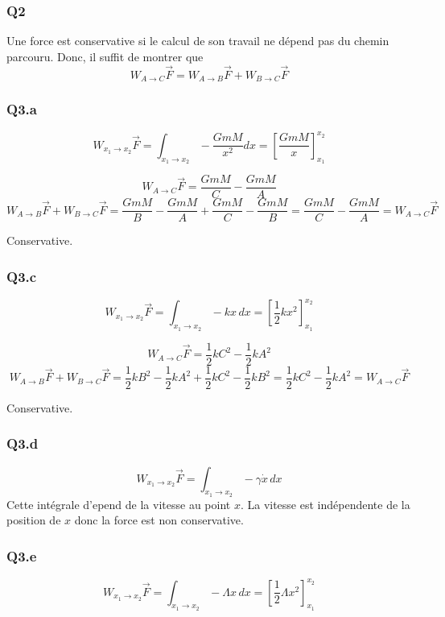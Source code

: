 \documentclass[]{book}
\theoremstyle{definition}
\begin{document}
\subsubsection{Q2}
Une force est conservative si le calcul de son travail ne d\'epend pas du chemin parcouru. Donc, il suffit de montrer que
$$W_{A \to C}\overrightarrow{F} = W_{A \to B}\overrightarrow{F} + W_{B \to C}\overrightarrow{F}$$

\subsubsection{Q3.a}
$$W_{x_1 \to x_2}\overrightarrow{F} = \int_{x_1 \to x_2} -\frac{GmM}{x^2} dx = [\frac{GmM}{x}]_{x_1}^{x_2}$$

$$W_{A \to C}\overrightarrow{F} = \frac{GmM}{C} - \frac{GmM}{A}$$
$$W_{A \to B}\overrightarrow{F} + W_{B \to C}\overrightarrow{F} = \frac{GmM}{B} - \frac{GmM}{A} + \frac{GmM}{C} - \frac{GmM}{B} = \frac{GmM}{C} - \frac{GmM}{A} = W_{A \to C}\overrightarrow{F}$$

Conservative.

\subsubsection{Q3.c}
$$W_{x_1 \to x_2}\overrightarrow{F} = \int_{x_1 \to x_2} -kx\, dx = [\frac{1}{2}kx^2]_{x_1}^{x_2}$$

$$W_{A \to C}\overrightarrow{F} = \frac{1}{2}kC^2 - \frac{1}{2}kA^2$$
$$W_{A \to B}\overrightarrow{F} + W_{B \to C}\overrightarrow{F} = \frac{1}{2}kB^2 - \frac{1}{2}kA^2 + \frac{1}{2}kC^2 - \frac{1}{2}kB^2 = \frac{1}{2}kC^2 - \frac{1}{2}kA^2 = W_{A \to C}\overrightarrow{F}$$

Conservative.

\subsubsection{Q3.d}
$$W_{x_1 \to x_2}\overrightarrow{F} = \int_{x_1 \to x_2} -\gamma \dot{x}\, dx$$
Cette int\'egrale d'epend de la vitesse au point $x$. La vitesse est ind\'ependente de la position de $x$ donc la force est non conservative.

\subsubsection{Q3.e}
$$W_{x_1 \to x_2}\overrightarrow{F} = \int_{x_1 \to x_2} -\Lambda x\, dx = [\frac{1}{2}\Lambda x^2]_{x_1}^{x_2}$$
\end{document}

